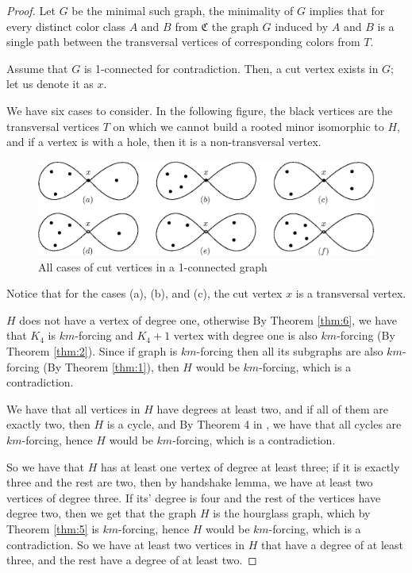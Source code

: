 \begin{proof}
 Let $G$ be the minimal such graph, the minimality of $G$ implies that for every distinct color class $A$ and $B$ from $\mathfrak{C}$ the graph $G$ induced by $A$ and $B$ is a single path between the transversal vertices of corresponding colors from $T$.

 Assume that $G$ is 1-connected for contradiction. Then, a cut vertex exists in $G$; let us denote it as $x$. 
    
 We have six cases to consider.
 In the following figure, the black vertices are the transversal vertices $T$ on which we cannot build a rooted minor isomorphic to $H$, and if 
 a vertex is with a hole, then it is a non-transversal vertex.
       
    \begin{figure}[h]
       \centering
       \vspace{0.3cm}
       \includegraphics[width=13cm]{img/hourglass+1-cases.eps}
       \vspace{0.3cm}
       \caption{All cases of cut vertices in a 1-connected graph}
       \label{fig:2connected_counterexamples}
   \end{figure}
   
 Notice that for the cases (a), (b), and (c), the cut vertex $x$ is a transversal vertex.
   

   $H$ does not have a vertex of degree one, otherwise By Theorem \ref{thm:6}, we have that $K_4$ is $km$-forcing and $K_4 + 1$ vertex with degree one is also $km$-forcing (By Theorem \ref{thm:2}).
   Since if graph is $km$-forcing then all its subgraphs are also $km$-forcing (By Theorem \ref{thm:1}), then $H$ would be $km$-forcing, which is a contradiction.

 We have that all vertices in $H$ have degrees at least two, and if all of them are exactly two, then $H$ is a cycle, and By Theorem 4 in \cite{matthias_2022}, we have that
 all cycles are $km$-forcing, hence $H$ would be $km$-forcing, which is a contradiction.

 So we have that $H$ has at least one vertex of degree at least three; if it is exactly three and the rest are two, then by handshake lemma, we have at least 
 two vertices of degree three. If its' degree is four and the rest of the vertices have degree two, then we get that the graph $H$ is 
 the hourglass graph, which by Theorem \ref{thm:5} is $km$-forcing, hence $H$ would be $km$-forcing, which is a contradiction. So we have
 at least two vertices in $H$ that have a degree of at least three, and the rest have a degree of at least two.


\end{proof}
